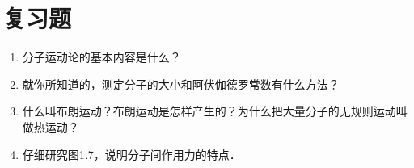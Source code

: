 \section*{复习题}
\begin{enumerate}
\item 分子运动论的基本内容是什么？
\item 就你所知道的，测定分子的大小和阿伏伽德罗常数有什么方法？
\item 什么叫布朗运动？布朗运动是怎样产生的？为什么把大量分子的无规则运动叫做热运动？
\item 仔细研究图1.7，说明分子间作用力的特点．
\end{enumerate}















